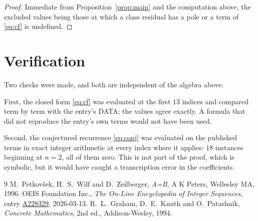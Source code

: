 \documentclass[11pt,a4paper]{article}
\theoremstyle{plain}
\theoremstyle{definition}
\begin{document}
\begin{proof}
Immediate from Proposition~\ref{prop:main} and the computation above, the excluded values
being those at which a class residual has a pole or a term of \eqref{eq:cf} is undefined.
\end{proof}

\section{Verification}

Two checks were made, and both are independent of the algebra above.

First, the closed form \eqref{eq:cf} was evaluated at the first $13$ indices and
compared term by term with the entry's DATA; the values agree exactly. A formula that did
not reproduce the entry's own terms would not have been used.

Second, the conjectured recurrence \eqref{eq:conj} was evaluated on the published terms in
exact integer arithmetic at every index where it applies: $18$ instances beginning at
$n=2$, all of them zero. This is not part of the proof, which is symbolic, but it
would have caught a transcription error in the coefficients.

\begin{thebibliography}{9}
 M.~Petkov\v{s}ek, H.~S.~Wilf and D.~Zeilberger, \emph{A=B}, A K Peters,
Wellesley MA, 1996.
 OEIS Foundation Inc., \emph{The On-Line Encyclopedia of Integer Sequences},
entry \href{https://oeis.org/A228329}{A228329}, 2026-03-13.
 R.~L.~Graham, D.~E.~Knuth and O.~Patashnik, \emph{Concrete Mathematics},
2nd ed., Addison-Wesley, 1994.
\end{thebibliography}
\end{document}
